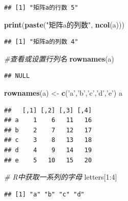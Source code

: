 \documentclass[]{article}
\newenvironment{Shaded}{\begin{snugshade}}{\end{snugshade}}
\newcommand{\KeywordTok}[1]{\textcolor[rgb]{0.13,0.29,0.53}{\textbf{{#1}}}}
\newcommand{\DecValTok}[1]{\textcolor[rgb]{0.00,0.00,0.81}{{#1}}}
\newcommand{\StringTok}[1]{\textcolor[rgb]{0.31,0.60,0.02}{{#1}}}
\newcommand{\CommentTok}[1]{\textcolor[rgb]{0.56,0.35,0.01}{\textit{{#1}}}}
\newcommand{\NormalTok}[1]{{#1}}
\numberwithin{figure}{section}
\numberwithin{table}{section}
\theoremstyle{definition}
\theoremstyle{definition}
\theoremstyle{definition}
\theoremstyle{remark}
\begin{document}
\begin{verbatim}
## [1] "矩阵a的行数 5"
\end{verbatim}

\begin{Shaded}
\begin{Highlighting}[]
\KeywordTok{print}\NormalTok{(}\KeywordTok{paste}\NormalTok{(}\StringTok{"矩阵a的列数"}\NormalTok{, }\KeywordTok{ncol}\NormalTok{(a)))}
\end{Highlighting}
\end{Shaded}

\begin{verbatim}
## [1] "矩阵a的列数 4"
\end{verbatim}

\begin{Shaded}
\begin{Highlighting}[]
\CommentTok{#查看或设置行列名}
\KeywordTok{rownames}\NormalTok{(a)}
\end{Highlighting}
\end{Shaded}

\begin{verbatim}
## NULL
\end{verbatim}

\begin{Shaded}
\begin{Highlighting}[]
\KeywordTok{rownames}\NormalTok{(a) <-}\StringTok{ }\KeywordTok{c}\NormalTok{(}\StringTok{'a'}\NormalTok{,}\StringTok{'b'}\NormalTok{,}\StringTok{'c'}\NormalTok{,}\StringTok{'d'}\NormalTok{,}\StringTok{'e'}\NormalTok{)}
\NormalTok{a}
\end{Highlighting}
\end{Shaded}

\begin{verbatim}
##   [,1] [,2] [,3] [,4]
## a    1    6   11   16
## b    2    7   12   17
## c    3    8   13   18
## d    4    9   14   19
## e    5   10   15   20
\end{verbatim}

\begin{Shaded}
\begin{Highlighting}[]
\CommentTok{# R中获取一系列的字母}
\NormalTok{letters[}\DecValTok{1}\NormalTok{:}\DecValTok{4}\NormalTok{]}
\end{Highlighting}
\end{Shaded}

\begin{verbatim}
## [1] "a" "b" "c" "d"
\end{verbatim}
\end{document}

